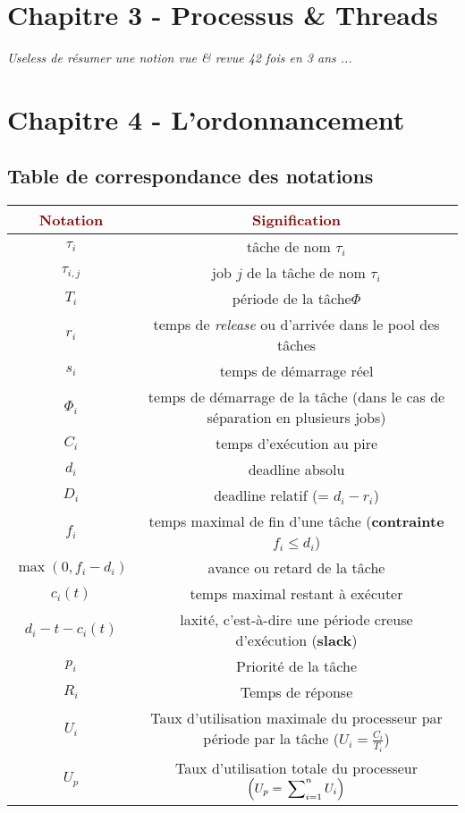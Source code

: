 \documentclass{article}
\newcommand{\dred}[1]{\textcolor{darkred}{\textbf{#1}}}
\newcommand{\sumin}[3]{\sideset{}{_{i=#1}^{#2}}\sum{#3}}
\begin{document}
\section{Chapitre 3 - Processus \& Threads}

\textit{Useless de résumer une notion vue \& revue 42 fois en 3 ans ...}

\section{Chapitre 4 - L'ordonnancement}

\subsection{Table de correspondance des notations}

\begin{center}
	\begin{tabular}{|*{2}{c|}}
	\hline
	\dred{Notation} & \dred{Signification} \\
	\hline
	$\tau_i$ & tâche de nom $\tau_i$\\
	\hline
	$\tau_{i,j}$ & job $j$ de la tâche de nom $\tau_i$\\
	\hline
	$T_i$ & période de la tâche$\Phi$\\
	\hline
	$r_i$ & temps de \textit{release} ou d'arrivée dans le pool des tâches\\
	\hline
	$s_i$ & temps de démarrage réel\\
	\hline
	$\Phi_i$ & temps de démarrage de la tâche (dans le cas de séparation en plusieurs jobs)\\
	\hline
	$C_i$ & temps d'exécution au pire\\
	\hline
	$d_i$ & deadline absolu\\
	\hline
	$D_i$ & deadline relatif (= $d_i-r_i$)\\
	\hline
	$f_i$ & temps maximal de fin d'une tâche (\textbf{contrainte} $f_i\leq d_i$)\\
	\hline
	$\max{(0,f_i-d_i)}$ & avance ou retard de la tâche \\
	\hline
	$c_i(t)$ & temps maximal restant à exécuter \\
	\hline
	$d_i-t-c_i(t)$ & laxité, c'est-à-dire une période creuse d'exécution (\textbf{slack}) \\
	\hline
	$p_i$ & Priorité de la tâche \\
	\hline
	$R_i$ & Temps de réponse \\
	\hline
	$U_i$ & Taux d'utilisation maximale du processeur par période par la tâche ($U_i = \frac{C_i}{T_i}$) \\
	\hline
	$U_p$ & Taux d'utilisation totale du processeur $\left(U_p = \sumin{1}{n}{U_i}\right)$ \\
	\hline
	\end{tabular}
\end{center}
\end{document}
